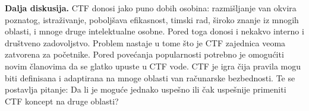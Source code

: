 \documentclass[12pt, a4paper, twocolumn]{article}
\begin{document}
\textbf{Dalja diskusija.} CTF donosi jako puno dobih osobina: razmišljanje 
van okvira poznatog, istraživanje, poboljšava efikasnost, timski rad, široko 
znanje iz mnogih oblasti, i mnoge druge intelektualne osobne. Pored toga 
donosi i nekakvo interno i društveno zadovoljstvo. Problem nastaje u tome što 
je CTF zajednica veoma zatvorena za početnike. Pored povećanja popularnosti 
potrebno je omogućiti novim članovima da se glatko upuste u CTF vode. CTF je 
igra čija pravila mogu biti definisana i adaptirana na mnoge oblasti van 
računarske bezbednosti. Te se postavlja pitanje: Da li je moguće jednako 
uspešno ili čak uspešnije primeniti CTF koncept na druge oblasti?

\nocite{*}

\printbibliography
\end{document}
